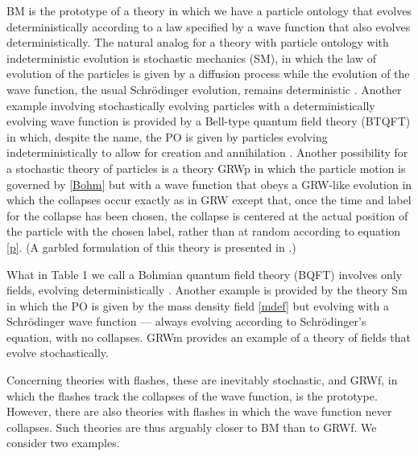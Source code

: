 \documentclass[12pt]{article}
\begin{document}
{\sf BM} is the prototype of a theory in which we have a particle ontology that evolves deterministically according to a law specified by a wave function that also evolves deterministically. The natural analog for a theory with particle ontology with indeterministic evolution is stochastic mechanics ({\sf SM}), in which the law of evolution of the particles is given by a diffusion process while the evolution of the wave function, the usual Schr\"odin\-ger evolution, remains deterministic 
\citep[see][for details]{stochmech1,stochmech2}.
Another example involving stochastically evolving particles with a deterministically evolving wave function is provided by a Bell-type quantum field theory ({\sf BTQFT}) in which, despite the name, the PO is given by particles evolving indeterministically to allow for creation and annihilation \citep[for a description, see][]{crlet,crea2B,Bell86}. 
Another possibility for a stochastic theory of particles is a theory {\sf GRWp} in which the particle motion is governed by \eqref{Bohm} but with a wave function that obeys a {\sf GRW}-like  evolution in which the collapses occur exactly as in {\sf GRW} except that, once the time and label for the collapse has been chosen, the collapse is centered at the actual position of the particle with the chosen label, rather than at random according to equation \eqref{p}. (A garbled formulation of this theory is presented in \citep[p. 346]{BohmHiley}.)

What in Table 1 we call a Bohmian quantum field theory ({\sf BQFT}) involves only fields, evolving deterministically \citep{Bohm52,westman}.
Another example is provided by the theory {\sf Sm} in which the PO is given by the mass density field \eqref{mdef} but evolving with a Schr\"odinger wave function --- always evolving according to Schr\"odinger's equation, with no collapses.   
{\sf GRWm} provides an example of a theory of fields that evolve stochastically. 

Concerning theories with flashes, these are inevitably stochastic, and {\sf GRWf}, in which the flashes track the collapses of the wave function, is the prototype. However, there are also theories with flashes in which the wave function never collapses. Such theories are thus arguably closer
to {\sf BM} than to {\sf GRWf}. We consider two examples.
\end{document}

